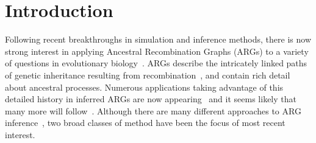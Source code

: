 \documentclass{article}
\begin{document}
\section*{Introduction}
Following recent breakthroughs in simulation and inference methods,
there is now strong interest in applying Ancestral Recombination Graphs (ARGs)
to a variety of questions in evolutionary biology~\citep{lewanski_era_2024,brandt_promise_2024,nielsen_inference_2025}. 
ARGs describe the intricately linked paths
of genetic inheritance resulting from
recombination~\citep{hudson_properties_1983,griffiths_ancestral_1996,wong_general_2023},
and contain rich detail about ancestral processes. 
Numerous applications taking advantage of this detailed history
in inferred ARGs are now appearing~\citep{
stern_approximate_2019,
fan_genealogical_2022,
hejase_deep_2022,
guo_recombination-aware_2022,
ignatieva_ongoing_2022,
wang_complex_2022,
zhang_biobank-scale_2023,
nowbandegani_extremely_2023,
ignatieva_distribution_2023,
fan_likelihood_2023,
osmond_estimating_2021,
huang_estimating_2024,
grundler_geographic_2024,
korfmann_simultaneous_2024,
deraje_inferring_2024,
speidel2025high}
and it seems likely that many more will
follow~\citep{harris_database_2019,harris_using_2023}.
Although there are many different approaches to ARG
inference~\citep{wong_general_2023}, two broad classes of method
have been the focus of most recent interest.
\end{document}
